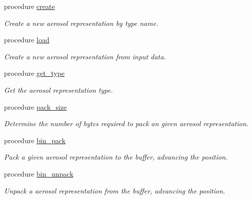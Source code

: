 \begin{DoxyCompactItemize}
\item 
procedure \mbox{\hyperlink{structpmc__aero__rep__factory_1_1aero__rep__factory__t_a13e664c96d91e133ac8e3cc21a9576d8}{create}}
\begin{DoxyCompactList}\small\item\em Create a new aerosol representation by type name. \end{DoxyCompactList}\item 
procedure \mbox{\hyperlink{structpmc__aero__rep__factory_1_1aero__rep__factory__t_a2225db5722093009f763ec6696bd6e58}{load}}
\begin{DoxyCompactList}\small\item\em Create a new aerosol representation from input data. \end{DoxyCompactList}\item 
procedure \mbox{\hyperlink{structpmc__aero__rep__factory_1_1aero__rep__factory__t_a0337e39b9803f756984d00c30d8b2ffb}{get\+\_\+type}}
\begin{DoxyCompactList}\small\item\em Get the aerosol representation type. \end{DoxyCompactList}\item 
procedure \mbox{\hyperlink{structpmc__aero__rep__factory_1_1aero__rep__factory__t_a08c46abe036797bd4fcd0b767f33c5ae}{pack\+\_\+size}}
\begin{DoxyCompactList}\small\item\em Determine the number of bytes required to pack an given aerosol representation. \end{DoxyCompactList}\item 
procedure \mbox{\hyperlink{structpmc__aero__rep__factory_1_1aero__rep__factory__t_ad59c8a115457a10cbb956ede03d21b6e}{bin\+\_\+pack}}
\begin{DoxyCompactList}\small\item\em Pack a given aerosol representation to the buffer, advancing the position. \end{DoxyCompactList}\item 
procedure \mbox{\hyperlink{structpmc__aero__rep__factory_1_1aero__rep__factory__t_a98d87d846c9457ca431d617f53170111}{bin\+\_\+unpack}}
\begin{DoxyCompactList}\small\item\em Unpack a aerosol representation from the buffer, advancing the position. \end{DoxyCompactList}\end{DoxyCompactItemize}


